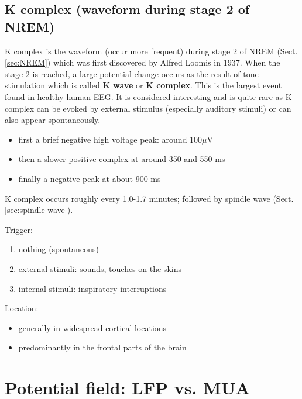 \subsection{K complex (waveform during stage 2 of NREM)}
\label{sec:K-complex}

K complex is the waveform (occur more frequent) during stage 2 of NREM
(Sect.\ref{sec:NREM}) which was first discovered by Alfred Loomis in 1937.
When the stage 2 is reached, a large potential change occurs as the result of
tone stimulation which is called {\bf K wave} or {\bf K complex}. 
This is the largest event found in healthy human EEG.
It is considered interesting and is quite rare as K complex can be evoked by
external stimulus (especially auditory stimuli) or can also appear
spontaneously.  

\begin{itemize}
  \item first a brief negative high voltage peak:
  around 100$\mu$V
  
  \item then a slower positive complex at around 350 and 550 ms
  
  \item finally a negative peak at about 900 ms
\end{itemize}

K complex occurs roughly every 1.0-1.7 minutes; followed by spindle wave
(Sect.\ref{sec:spindle-wave}).


Trigger:
\begin{enumerate}
  \item nothing (spontaneous)
  
  \item external stimuli:  sounds, touches on the skins
  
  \item internal stimuli: inspiratory interruptions
\end{enumerate}

Location: 
\begin{itemize}
  \item generally in widespread cortical locations
  
  \item predominantly in the frontal parts of the brain
\end{itemize}

\section{Potential field: LFP vs. MUA}
\label{sec:potential-field}
\label{sec:field-potential}

